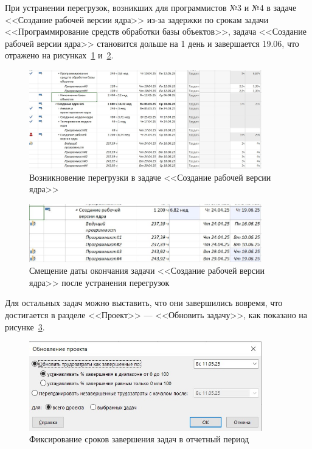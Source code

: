 При устранении перегрузок, возникших для программистов №3 и №4 в задаче <<Создание рабочей версии ядра>> из-за задержки по срокам задачи  <<Программирование средств обработки базы объектов>>, задача <<Создание рабочей версии ядра>> становится дольше на 1 день и завершается 19.06, что отражено на рисунках~\ref{fig:screen19} и~\ref{fig:screen20}.

\begin{figure}[H]
	\centering
	\includegraphics[width=0.9\textwidth]{img/screen19.jpg}
	\caption{Возникновение перегрузки в задаче <<Создание рабочей версии ядра>>}
	\label{fig:screen19}
\end{figure}

\begin{figure}[H]
	\centering
	\includegraphics[width=0.9\textwidth]{img/screen20.jpg}
	\caption{Смещение даты окончания задачи <<Создание рабочей версии ядра>> после устранения перегрузок}
	\label{fig:screen20}
\end{figure}

Для остальных задач можно выставить, что они завершились вовремя, что достигается в разделе <<Проект>> --- <<Обновить задачу>>, как показано на рисунке~\ref{fig:screen34}.

\begin{figure}[H]
	\centering
	\includegraphics[width=0.9\textwidth]{img/screen34.jpg}
	\caption{Фиксирование сроков завершения задач в отчетный период}
	\label{fig:screen34}
\end{figure}

